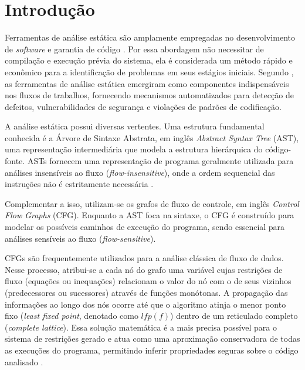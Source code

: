 \documentclass[
    12pt,                %
    openright,           %
    oneside,             %
    a4paper,             %
    english,             %
    brazil               %
]{abntex2}
\begin{document}
\chapter{Introdução}
\label{cap:introducao}
\par
Ferramentas de análise estática são amplamente empregadas no desenvolvimento de \textit{software} e garantia de código \cite{hou2025generation}.
Por essa abordagem não necessitar de compilação e execução prévia do sistema, ela é considerada um método rápido e econômico para a identificação de problemas em seus estágios iniciais.
Segundo , as ferramentas de análise estática emergiram como componentes indispensáveis nos fluxos de trabalhos, fornecendo mecanismos automatizados para detecção de defeitos, vulnerabilidades de segurança e violações de padrões de codificação.
\par
A análise estática possui diversas vertentes.
Uma estrutura fundamental conhecida é a Árvore de Sintaxe Abstrata, em inglês \textit{Abstract Syntax Tree} (AST), uma representação intermediária que modela a estrutura hierárquica do código-fonte.
ASTs fornecem uma representação de programa geralmente utilizada para análises insensíveis ao fluxo (\textit{flow-insensitive}), onde a ordem sequencial das instruções não é estritamente necessária \cite{moller2024spa}.
\par 
Complementar a isso, utilizam-se os grafos de fluxo de controle, em inglês \textit{Control Flow Graphs} (CFG).
Enquanto a AST foca na sintaxe, o CFG é construído para modelar os possíveis caminhos de execução do programa, sendo essencial para análises sensíveis ao fluxo (\textit{flow-sensitive}).
\par 
CFGs são frequentemente utilizados para a análise clássica de fluxo de dados.
Nesse processo, atribui-se a cada nó do grafo uma variável cujas restrições de fluxo (equações ou inequações) relacionam o valor do nó com o de seus vizinhos (predecessores ou sucessores) através de funções monótonas.
A propagação das informações ao longo dos nós ocorre até que o algoritmo atinja o menor ponto fixo (\textit{least fixed point}, denotado como $lfp(f)$) dentro de um reticulado completo (\textit{complete lattice}).
Essa solução matemática é a mais precisa possível para o sistema de restrições gerado e atua como uma aproximação conservadora de todas as execuções do programa, permitindo inferir propriedades seguras sobre o código analisado \cite{moller2024spa}.
\end{document}
